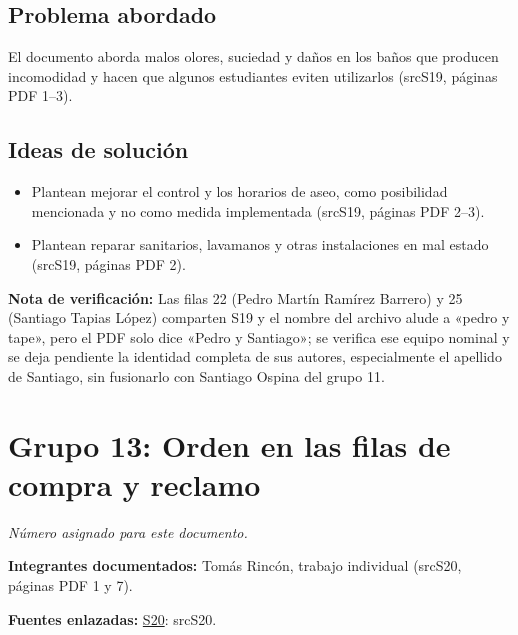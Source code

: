 \documentclass[11pt,a4paper]{article}
\newcommand{\evid}[2]{(\csname src#1\endcsname, páginas PDF #2)}
\begin{document}
\subsection*{Problema abordado}
El documento aborda malos olores, suciedad y daños en los baños que producen incomodidad y hacen que algunos estudiantes eviten utilizarlos \evid{S19}{1--3}.
\subsection*{Ideas de solución}
\begin{itemize}
\item Plantean mejorar el control y los horarios de aseo, como posibilidad mencionada y no como medida implementada \evid{S19}{2--3}.
\item Plantean reparar sanitarios, lavamanos y otras instalaciones en mal estado \evid{S19}{2}.
\end{itemize}
{\small\textbf{Nota de verificación:} Las filas 22 (Pedro Martín Ramírez Barrero) y 25 (Santiago Tapias López) comparten S19 y el nombre del archivo alude a «pedro y tape», pero el PDF solo dice «Pedro y Santiago»; se verifica ese equipo nominal y se deja pendiente la identidad completa de sus autores, especialmente el apellido de Santiago, sin fusionarlo con Santiago Ospina del grupo 11.}
\clearpage
\section*{Grupo 13: Orden en las filas de compra y reclamo}
\textit{Número asignado para este documento.}

\textbf{Integrantes documentados:} Tomás Rincón, trabajo individual \evid{S20}{1 y 7}.

\textbf{Fuentes enlazadas:} \hyperlink{fuente-S20}{S20}: \csname srcS20\endcsname.
\end{document}
